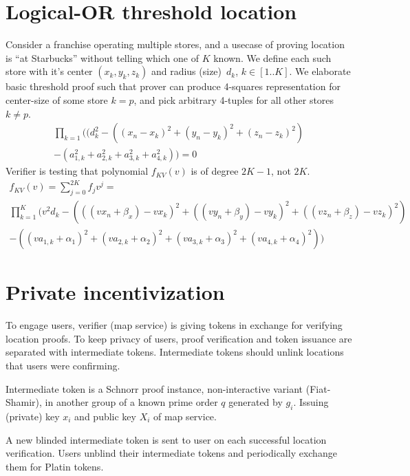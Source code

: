 \documentclass[a4paper,12pt]{article}
\begin{document}
\section{Logical-OR threshold location}

Consider a franchise operating multiple stores,
and a usecase of proving location is ``at Starbucks'' without telling which one of $K$ known.
We define each such store with it's center $(x_k, y_k, z_k)$ and radius (size)~$d_k$, $k \in [1 .. K]$.
We elaborate basic threshold proof such that prover can produce
4-squares representation for center-size of some store $k=p$,
and pick arbitrary 4-tuples for all other stores $k \ne p$.
\begin{multline}
\label{eq-distn-or}
  \prod_{k=1}
    ((d_k^2 - ((x_n - x_k)^2 + (y_n - y_k)^2 + (z_n - z_k)^2) \\
     - (a_{1, k}^2 + a_{2, k}^2 + a_{3, k}^2 + a_{4, k}^2)) = 0
\end{multline}
Verifier is testing that polynomial $f_{KV}(v)$ is of degree $2K-1$, not $2K$.
\begin{multline}
  f_{KV}(v) = \sum_{j=0}^{2K} f_j v^j = \\
  \prod_{k=1}^{K} (
    v^2 d_k - (((v x_n + \beta_x) - v x_k)^2 +
               ((v y_n + \beta_y) - v y_k)^2 +
               ((v z_n + \beta_z) - v z_k)^2)  \\
        - ((v a_{1,k} + \alpha_1)^2 +
           (v a_{2,k} + \alpha_2)^2 +
           (v a_{3,k} + \alpha_3)^2 +
           (v a_{4,k} + \alpha_4)^2) )
\end{multline}

\section{Private incentivization}

To engage users, verifier (map service) is giving tokens in exchange for verifying location proofs.
To keep privacy of users, proof verification and token issuance are separated with intermediate tokens.
Intermediate tokens should unlink locations that users were confirming.

Intermediate token is a Schnorr proof instance, non-interactive variant (Fiat-Shamir),
in another group of a known prime order $q$ generated by $g_i$.
Issuing (private) key $x_i$ and public key $X_i$ of map service.

A new blinded intermediate token is sent to user on each successful location verification.
Users unblind their intermediate tokens and periodically exchange them for Platin tokens.
\end{document}
